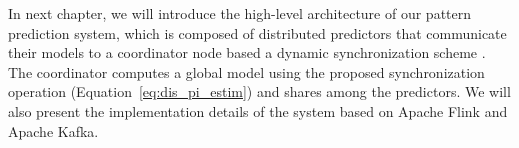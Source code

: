  \par In next chapter, we will introduce the high-level architecture of our pattern prediction system, which is composed of distributed \pmcmr predictors \cite{alevizos2017event} that communicate their models to a coordinator node based a dynamic synchronization scheme \cite{kamp2014communication}. The coordinator computes a global model using the proposed synchronization operation (Equation~\ref{eq:dis_pi_estim}) and shares among the predictors. We will also present the implementation details of the system based on Apache Flink and Apache Kafka.    
 
 